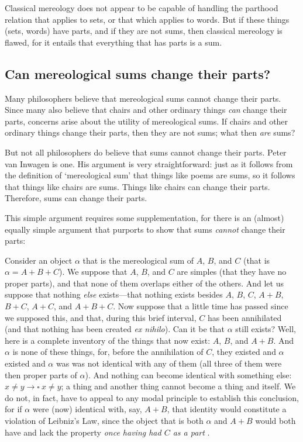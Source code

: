 \documentclass[12pt,twoside]{reedfancy}
\newenvironment{squote}{%
	\begin{spacing}{1}
	\begin{list}{}{%
	\setlength{\labelwidth}{0pt}%
	\rightmargin\leftmargin%
	}
	\item\relax
	}{%
	\end{list}%
	\end{spacing}
	}
\begin{document}
\begin{spacing}{1.25}
Classical mereology does not appear to be capable of handling the
parthood relation that applies to sets, or that which applies to
words.  But if these things (sets, words) have parts, and if they are
not sums, then classical mereology is flawed, for it entails that
everything that has parts is a sum.

\subsection{Can mereological sums change their parts?}
\label{change}
Many philosophers believe that mereological sums cannot change their
parts.  Since many also believe that chairs and other ordinary things
{\em can} change their parts, concerns arise about the utility of
mereological sums.  If chairs and other ordinary things change their
parts, then they are not sums; what then {\em are} sums?

But not all philosophers do believe that sums cannot change their
parts.  Peter van Inwagen is one.  His argument is very
straightforward:  just as it follows from the definition of
`mereological sum' that things like poems are sums, so it follows that
things like chairs are sums.  Things like chairs can change their
parts.  Therefore, sums can change their parts.

This simple argument requires some supplementation, for there is an
(almost) equally simple argument that purports to show that sums {\em
  cannot} change their parts:

\begin{squote}
Consider an object $\alpha$ that is the mereological sum of $A$, $B$,
and $C$ (that is $\alpha = A + B + C$).  We suppose that $A$, $B$, and
$C$ are simples (that they have no proper parts), and that none of
them overlaps either of the others.  And let us suppose that nothing
{\em else} exists---that nothing exists besides $A$, $B$, $C$, $A +
B$, $B + C$, $A + C$, and $A + B + C$.  Now suppose that a little time
has passed since we supposed this, and that, during this brief
interval, $C$ has been annihilated (and that nothing has been created
{\em ex nihilo}).  Can it be that $\alpha$ still exists?  Well, here
is a complete inventory of the things that now exist: $A$, $B$, and $A
+ B$.  And $\alpha$ is none of these things, for, before the
annihilation of $C$, they existed and $\alpha$ existed and $\alpha$
was was not identical with any of them (all three of them were then
proper parts of $\alpha$).  And nothing can become identical with
something else: $x \neq y \rightarrow \square\ x \neq y$; a thing and
another thing cannot become a thing and itself.  We do not, in fact,
have to appeal to any modal principle to establish this conclusion,
for if $\alpha$ were (now) identical with, say, $A + B$, that identity
would constitute a violation of Leibniz's Law, since the object that
is both $\alpha$ and $A + B$ would both have and lack the property
{\em once having had $C$ as a part} \citep[628]{inwagen2006}.
\end{squote}


\end{spacing}
\end{document}
